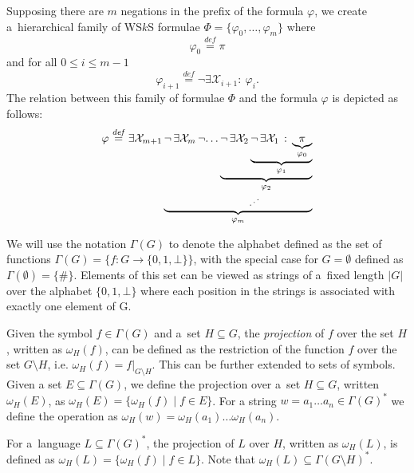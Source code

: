 Supposing there are $m$	negations in the prefix of the formula $\varphi$, we
create a~hierarchical family of WS$k$S formulae $\Phi = \{\varphi_0,\ldots,\varphi_m\}$
where
\begin{equation}
  \varphi_0 \overset{\mathit{def}}{=} \pi
\end{equation}
and for all $0 \leq i \leq m \minus 1$
\begin{equation}
 \varphi_{i+1} \overset{\mathit{def}}{=} \neg\exists\mathcal{X}_{i+1}:\ 
 \varphi_i.
\end{equation}
The relation between this family of formulae $\Phi$ and the formula $\varphi$ is
depicted as follows:
\begin{equation}
\begin{aligned}
\varphi \overset{\mathit{def}}{=} \exists \mathcal{X}_{m+1}\,
\underset{\varphi_m}{\underbrace{
  \neg\,\exists \mathcal{X}_m\,
  \neg
  \underset{\hspace{-3mm}\iddots}{
    \dots 
    \underset{\varphi_2}{\underbrace{
      \neg \,\exists \mathcal{X}_2\,
      \underset{\varphi_1}{\underbrace{
        \neg \,\exists \mathcal{X}_1\,:\,
        \underset{\varphi_0}{\underbrace{
          \pi
        }}
      }}
    }}
  }
}}
\end{aligned}
\end{equation}

We will use the notation $\Gamma(G)$ to denote the alphabet defined as the
set of functions $\Gamma(G) = \{f : G \rightarrow \{0, 1, \bot\}\}$, with the
special case for $G = \emptyset$ defined as $\Gamma(\emptyset) = \{\#\}$. Elements of this set can
be viewed as strings of a~fixed length $|G|$ over the alphabet $\{0, 1, \bot\}$
where each position in the strings is associated with exactly one element of G.

Given the symbol $f \in \Gamma(G)$ and a~set $H \subseteq G$, the
\emph{projection} of $f$ over the set $H$, written as $\omega_H(f)$, can be
defined as the restriction of the function $f$ over the set $G\setminus H$, i.e.
$\omega_H(f) = f|_{G\setminus H}$. This can be further extended to sets of symbols. Given a
set $E \subseteq \Gamma(G)$, we define the projection over a~set $H \subseteq
G$, written $\omega_H(E)$, as $\omega_H(E) = \{\omega_H(f) \mid f \in E\}$. For
a string $w = a_1\ldots a_n \in \Gamma(G)^*$ we define the operation as
$\omega_H(w) = \omega_H(a_1)\ldots\omega_H(a_n)$.

For a~language $L \subseteq \Gamma(G)^*$, the projection of $L$ over $H$,
written as $\omega_H(L)$, is defined as $\omega_H(L) = \{\omega_H(f) \mid f \in
L\}$. Note that $\omega_H(L) \subseteq \Gamma(G\setminus H)^*$.

